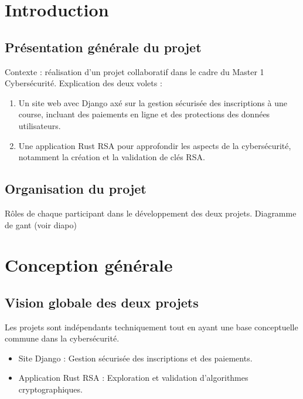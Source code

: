 \documentclass[12pt]{article} %
\begin{document}
\section{Introduction}
	\subsection{Présentation générale du projet}
		Contexte : réalisation d’un projet collaboratif dans le cadre du Master 1 Cybersécurité.
Explication des deux volets :
\begin{enumerate}
    \item Un site web avec Django axé sur la gestion sécurisée des inscriptions à une course, incluant des paiements en ligne et des protections des données utilisateurs.
    \item Une application Rust RSA pour approfondir les aspects de la cybersécurité, notamment la création et la validation de clés RSA.

\end{enumerate}
	
			
		
	\subsection{Organisation du projet}
		Rôles de chaque participant dans le développement des deux projets.
		Diagramme de gant (voir diapo)
	



\section{Conception générale}
	\subsection{Vision globale des deux projets}
		Les projets sont indépendants techniquement tout en ayant une base conceptuelle commune dans la cybersécurité.
        \begin{itemize}
            \item Site Django : Gestion sécurisée des inscriptions et des paiements.
            \item Application Rust RSA : Exploration et validation d'algorithmes cryptographiques.
        \end{itemize}

	
\end{document}
